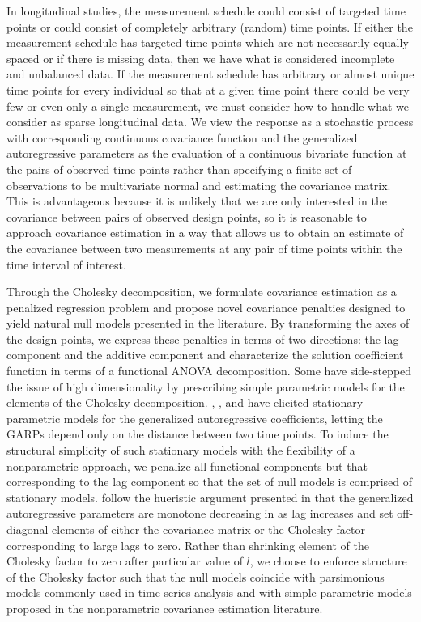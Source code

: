 In longitudinal studies, the measurement schedule could consist of targeted time points or could consist of completely arbitrary (random) time points. If either the measurement schedule has targeted time points which are not necessarily equally spaced or if there is missing data, then we have what is considered incomplete and unbalanced data. If the measurement schedule has arbitrary or almost unique time points for every individual so that at a given time point there could be very few or even only a single measurement, we must consider how to handle what we consider as sparse longitudinal data. We view the response as a stochastic process with corresponding continuous covariance function and the generalized autoregressive parameters as the evaluation of a continuous bivariate function at the pairs of observed time points rather than specifying a finite set of observations to be multivariate normal and estimating the covariance matrix. This is advantageous because it is unlikely that we are only interested in the covariance between pairs of observed design points, so it is reasonable to approach covariance estimation in a way that allows us to obtain an estimate of the covariance between two measurements at any pair of time points within the time interval of interest. 

\bigskip


Through the Cholesky decomposition, we formulate covariance estimation as a penalized regression problem and propose novel covariance penalties designed to yield natural null models presented in the literature. By transforming the axes of the design points, we express these penalties in terms of two directions: the lag component and the additive component and characterize the solution coefficient function in terms of a functional ANOVA decomposition. Some have side-stepped the issue of high dimensionality by prescribing simple parametric models for the elements of the Cholesky decomposition.  \cite{chen2011efficient}, \cite{pourahmadi1999joint}, and \cite{pourahmadi2002dynamic} have elicited stationary parametric models for the generalized autoregressive coefficients, letting the GARPs depend only on the distance between two time points. To induce the structural simplicity of such stationary models with the flexibility of a nonparametric approach, we penalize all functional components but that corresponding to the lag component so that the set of null models is comprised of stationary models.  \cite{huang2007estimation} follow the hueristic argument presented in \cite{pourahmadi1999joint} that the generalized autoregressive parameters are monotone decreasing in as lag increases and set off-diagonal elements of either the covariance matrix or the Cholesky factor corresponding to large lags to zero. Rather than shrinking element of the Cholesky factor to zero after particular value of $l$, we choose to enforce structure of the Cholesky factor such that the null models coincide with parsimonious models commonly used in time series analysis and with simple parametric models proposed in the nonparametric covariance estimation literature.

